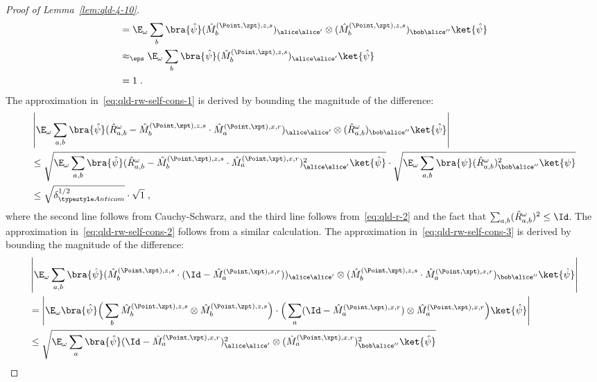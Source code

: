 \begin{proof}[Proof of Lemma~\ref{lem:qld-4-10}]
\begin{align}
		&= \E_\omega \sum_{b} \bra{\hat{\psi}} (\hat{M}^{(\Point,\zpt),z,s}_{b})_{\alice \alice'} \otimes (\hat{M}^{(\Point,\zpt),z,s}_{b})_{\bob \alice''} \ket{\hat{\psi}} \notag \\
		&\approx_{\eps} \E_\omega \sum_{b} \bra{\hat{\psi}} (\hat{M}^{(\Point,\zpt),z,s}_{b})_{\alice \alice'} \ket{\hat{\psi}} \label{eq:qld-rw-self-cons-4} \\
		&= 1\;. \notag
	\end{align}
   	The approximation in~\eqref{eq:qld-rw-self-cons-1} is derived by bounding the magnitude of the difference:
	\begin{align*}
		&\left | \E_\omega \sum_{a,b} \bra{\hat{\psi}} (\hat{R}^\omega_{a,b} - \hat{M}^{(\Point,\zpt),z,s}_{b} \cdot \hat{M}^{(\Point,\xpt),x,r}_{a})_{\alice \alice'} \otimes (\hat{R}^\omega_{a,b})_{\bob \alice''} \ket{\hat{\psi}} \right | \\
		&\leq \sqrt{\E_\omega \sum_{a,b} \bra{\hat{\psi}} (\hat{R}^\omega_{a,b} - \hat{M}^{(\Point,\zpt),z,s}_{b} \cdot \hat{M}^{(\Point,\xpt),x,r}_{a})_{\alice \alice'}^2 \ket{\hat{\psi}} } \cdot \sqrt{\E_\omega \sum_{a,b} \bra{\psi} (\hat{R}^\omega_{a,b})^2_{\bob \alice''} \ket{\psi} } \\
		&\leq \sqrt{\delta_{\acom}^{1/2}} \cdot \sqrt{1}\;,
	\end{align*}
	where the second line follows from Cauchy-Schwarz, and the third line follows from~\eqref{eq:qld-r-2} and the fact that $\sum_{a,b} (\hat{R}^\omega_{a,b})^2 \leq \Id$. The approximation in~\eqref{eq:qld-rw-self-cons-2} follows from a similar calculation. 
	The approximation in~\eqref{eq:qld-rw-self-cons-3} is derived by bounding the magnitude of the difference:
	\begin{align}
		&\left | \E_\omega \sum_{a,b} \bra{\hat{\psi}} (\hat{M}^{(\Point,\zpt),z,s}_{b} \cdot (\Id - \hat{M}^{(\Point,\xpt),x,r}_{a}))_{\alice \alice'}  \otimes (\hat{M}^{(\Point,\zpt),z,s}_{b} \cdot \hat{M}^{(\Point,\xpt),x,r}_{a})_{\bob \alice''} \ket{\hat{\psi}} \right | \notag \\
		&= \left | \E_\omega  \bra{\hat{\psi}} \Big(\sum_b \hat{M}^{(\Point,\zpt),z,s}_{b} \otimes \hat{M}^{(\Point,\zpt),z,s}_{b}\Big) \cdot \Big(\sum_{a} (\Id - \hat{M}^{(\Point,\xpt),x,r}_{a}) \otimes \hat{M}^{(\Point,\xpt),x,r}_{a} \Big) \ket{\hat{\psi}} \right | \\
		&\leq \sqrt{\E_\omega \sum_{a} \bra{\hat{\psi}} (\Id - \hat{M}^{(\Point,\xpt),x,r}_{a})_{\alice \alice'}^2 \otimes (\hat{M}^{(\Point,\xpt),x,r}_{a})_{\bob \alice''}^2 \ket{\hat{\psi}}} \label{eq:qld-rw-self-cons-3-1}\\

\end{align}
\end{proof}
